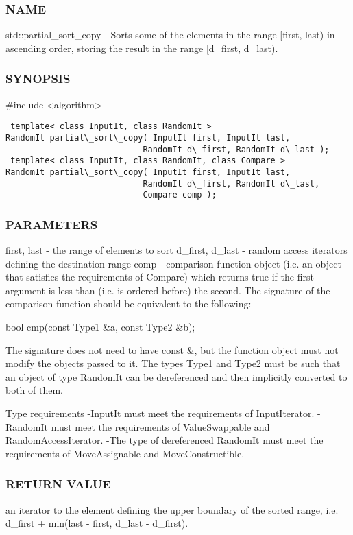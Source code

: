\subsubsection{NAME}
std::partial\_sort\_copy - Sorts some of the elements in the range [first, last) in ascending order, storing the result in the range [d\_first, d\_last).

\subsubsection{SYNOPSIS}
\#include <algorithm>

\begin{lstlisting}
 template< class InputIt, class RandomIt >
RandomIt partial\_sort\_copy( InputIt first, InputIt last,
                            RandomIt d\_first, RandomIt d\_last );
 template< class InputIt, class RandomIt, class Compare >
RandomIt partial\_sort\_copy( InputIt first, InputIt last,
                            RandomIt d\_first, RandomIt d\_last,
                            Compare comp );
\end{lstlisting}

\subsubsection{PARAMETERS}
first, last - the range of elements to sort
d\_first, d\_last - random access iterators defining the destination range
comp - comparison function object (i.e. an object that satisfies the requirements of Compare) which returns true if the first argument is less than (i.e. is ordered before) the second.
The signature of the comparison function should be equivalent to the following:

 bool cmp(const Type1 \&a, const Type2 \&b);

The signature does not need to have const \&, but the function object must not modify the objects passed to it.
The types Type1 and Type2 must be such that an object of type RandomIt can be dereferenced and then implicitly converted to both of them.

 Type requirements
 -InputIt must meet the requirements of InputIterator.
 -RandomIt must meet the requirements of ValueSwappable and RandomAccessIterator.
 -The type of dereferenced RandomIt must meet the requirements of MoveAssignable and MoveConstructible.

\subsubsection{RETURN VALUE}
an iterator to the element defining the upper boundary of the sorted range, i.e. d\_first + min(last - first, d\_last - d\_first).



